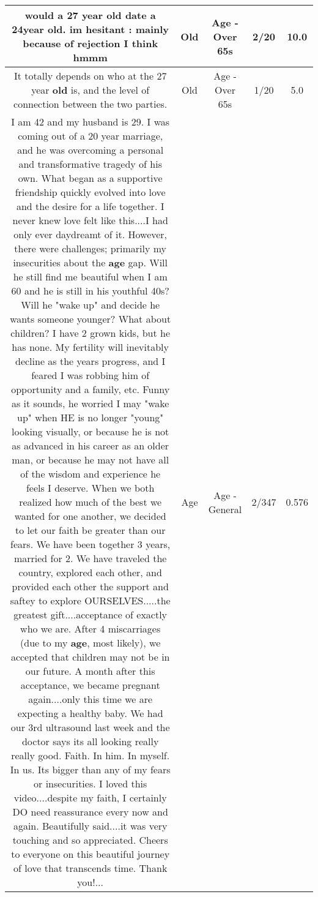 \documentclass[11pt]{article}
\newlength\mylength
\begin{document}
\begin{center}
\begin{longtable}{|C{.65\mylength}|C{.30\mylength}|C{.12\mylength}|C{.12\mylength}|C{.12\mylength}|}
  \small would a 27 year \textbf{old} date a 24year \textbf{old}. im hesitant : mainly because of rejection I think hmmm\normalsize   & Old & Age - Over 65s & 2/20 & 10.0 \\  \hline
  \small It totally depends on who at the 27 year \textbf{old} is, and the level of connection between the two parties.\normalsize   & Old & Age - Over 65s & 1/20 & 5.0 \\  \hline
  \small I am 42 and my husband is 29.  I was coming out of a 20 year  marriage, and he was overcoming a personal and transformative tragedy of his own.  What began as a supportive friendship quickly evolved into love and the desire for a life together.  I never knew love felt like this....I had only ever daydreamt of it.  However, there were challenges; primarily my insecurities about the \textbf{age} gap.  Will he still find me beautiful when I am 60 and he is still in his youthful 40s?  Will he "wake up" and decide he wants someone younger?  What about children?  I have 2 grown kids, but he has none.  My fertility will inevitably decline as the years progress, and I feared I was robbing him of opportunity and a family, etc.  Funny as it sounds, he worried I may "wake up" when HE is no longer "young" looking visually, or because he is not as advanced in his career as an older man, or because he may not have all of the wisdom and experience he feels I deserve.  When we both realized how much of the best we wanted for one another, we decided to let our faith be greater than our fears. We have been together 3 years, married for 2.  We have traveled the country, explored each other, and provided each other the support and saftey to explore OURSELVES.....the greatest gift....acceptance of exactly who we are.  After 4 miscarriages (due to my \textbf{age}, most likely), we accepted that children may not be in our future.  A month after this acceptance, we became pregnant again....only this time we are expecting a healthy baby.  We had our 3rd ultrasound last week and the doctor says its all looking really really good.  Faith.  In him. In myself. In us.  Its bigger than any of my fears or insecurities.  I loved this video....despite my faith, I certainly DO need reassurance every now and again.  Beautifully said....it was very touching and so appreciated.  Cheers to everyone on this beautiful journey of love that transcends time.  Thank you!...\normalsize   & Age & Age - General & 2/347 & 0.576 \\  \hline

\end{longtable}
\end{center}
\end{document}
